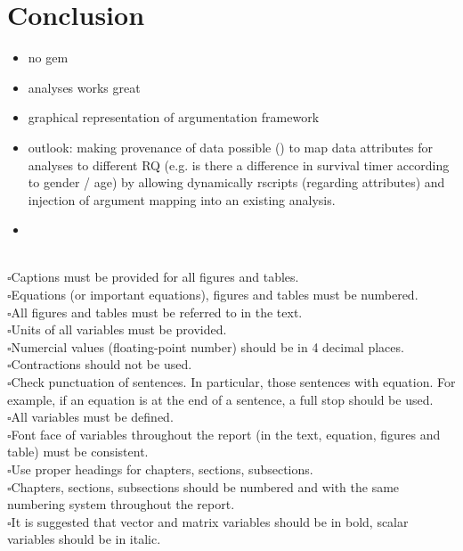 \section{Conclusion}
\label{sec:conclusion}
 
 
 \begin{itemize}
 	\item no gem
 	\item analyses works great
 	\item graphical representation of argumentation framework
 	\item outlook: making provenance of data possible () to map data attributes for analyses to different RQ (e.g. is there a difference in survival timer according to gender / age) by allowing dynamically rscripts (regarding attributes) and injection of argument mapping into an existing analysis.
 	\item 
 \end{itemize}
 
 
\\$\square${Captions must be provided for all figures and tables.}
\\$\square${Equations (or important equations), figures and tables must be numbered.}
\\$\square${All figures and tables must be referred to in the text.}
\\$\square${Units of all variables must be provided.}
\\$\square${Numercial values (floating-point number) should be in 4 decimal places.}
\\$\square${Contractions should not be used.}
\\$\square${Check punctuation of sentences.  In particular, those sentences with equation.  For example, if an equation is at the end of a sentence, a full stop should be used.}
\\$\square${All variables must be defined.}
\\$\square${Font face of variables throughout the report (in the text, equation, figures and table) must be consistent.}
\\$\square${Use proper headings for chapters, sections, subsections.}
\\$\square${Chapters, sections, subsections should be numbered and with the same numbering system throughout the report.}
\\$\square${It is suggested that vector and matrix variables should be in bold, scalar variables should be in italic.}
